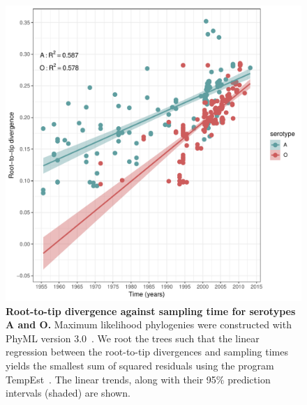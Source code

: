\documentclass[a4paper,10pt]{article}
\begin{document}
\begin{center}
\begin{figure}[H]
\begin{center}
\includegraphics[scale=.75]{FIGURES/PLOTS/rdvs.pdf}
\end{center}
\caption{
\textbf{Root-to-tip divergence against sampling time for serotypes A and O.}
Maximum likelihood phylogenies were constructed with PhyML version 3.0~\citep{M-Guindon2003}. 
We root the trees such that the linear regression between the root-to-tip divergences and sampling times yields the smallest sum of squared residuals using the program TempEst~\citep{M-Rambaut2016}.
The linear trends, along with their 95\% prediction intervals (shaded) are shown.
}
\label{sfig:root-to-tip}
\end{figure}
\end{center}
\newpage
\end{document}
